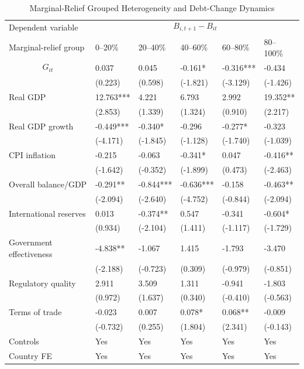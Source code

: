 \begin{table}[H]\centering
\begin{threeparttable}
\caption{Marginal-Relief Grouped Heterogeneity and Debt-Change Dynamics}
\label{tab:mG_group_heterogeneity_debt}
\scriptsize
\begin{tabularx}{\textwidth}{lYYYYY}
\toprule
Dependent variable &  \\
\cmidrule(lr){2-6}
Marginal-relief group & 0--20\% & 20--40\% & 40--60\% & 60--80\% & 80--100\% \\
\midrule
$$G_{it}$$ & 0.037 & 0.045 & -0.161* & -0.316*** & -0.434 \\
  & (0.223) & (0.598) & (-1.821) & (-3.129) & (-1.426) \\
Real GDP & 12.763*** & 4.221 & 6.793 & 2.992 & 19.352** \\
  & (2.853) & (1.339) & (1.324) & (0.910) & (2.217) \\
Real GDP growth & -0.449*** & -0.340* & -0.296 & -0.277* & -0.323 \\
  & (-4.171) & (-1.845) & (-1.128) & (-1.740) & (-1.039) \\
CPI inflation & -0.215 & -0.063 & -0.341* & 0.047 & -0.416** \\
  & (-1.642) & (-0.352) & (-1.899) & (0.473) & (-2.463) \\
Overall balance/GDP & -0.291** & -0.844*** & -0.636*** & -0.158 & -0.463** \\
  & (-2.094) & (-2.640) & (-4.752) & (-0.844) & (-2.094) \\
International reserves & 0.013 & -0.374** & 0.547 & -0.341 & -0.604* \\
  & (0.934) & (-2.104) & (1.411) & (-1.117) & (-1.729) \\
Government effectiveness & -4.838** & -1.067 & 1.415 & -1.793 & -3.470 \\
  & (-2.188) & (-0.723) & (0.309) & (-0.979) & (-0.851) \\
Regulatory quality & 2.911 & 3.509 & 1.311 & -0.941 & -1.803 \\
  & (0.972) & (1.637) & (0.340) & (-0.410) & (-0.563) \\
Terms of trade & -0.023 & 0.007 & 0.078* & 0.068** & -0.009 \\
  & (-0.732) & (0.255) & (1.804) & (2.341) & (-0.143) \\
\midrule
Controls & Yes & Yes & Yes & Yes & Yes \\
Country FE & Yes & Yes & Yes & Yes & Yes \\

\end{tabularx}
\end{threeparttable}
\end{table}
